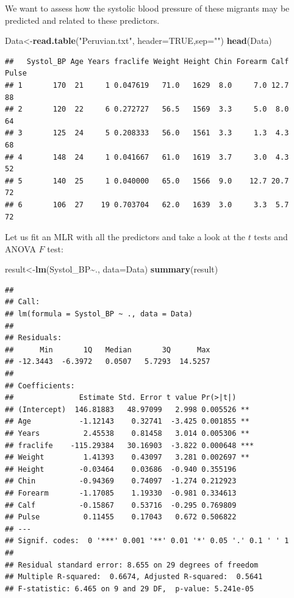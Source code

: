 \documentclass[
]{book}
\newenvironment{Shaded}{\begin{snugshade}}{\end{snugshade}}
\newcommand{\AttributeTok}[1]{\textcolor[rgb]{0.13,0.29,0.53}{#1}}
\newcommand{\ConstantTok}[1]{\textcolor[rgb]{0.56,0.35,0.01}{#1}}
\newcommand{\FunctionTok}[1]{\textcolor[rgb]{0.13,0.29,0.53}{\textbf{#1}}}
\newcommand{\NormalTok}[1]{#1}
\newcommand{\OtherTok}[1]{\textcolor[rgb]{0.56,0.35,0.01}{#1}}
\newcommand{\SpecialCharTok}[1]{\textcolor[rgb]{0.81,0.36,0.00}{\textbf{#1}}}
\newcommand{\StringTok}[1]{\textcolor[rgb]{0.31,0.60,0.02}{#1}}
\begin{document}
We want to assess how the systolic blood pressure of these migrants may be predicted and related to these predictors.

\begin{Shaded}
\begin{Highlighting}[]
\NormalTok{Data}\OtherTok{\textless{}{-}}\FunctionTok{read.table}\NormalTok{(}\StringTok{"Peruvian.txt"}\NormalTok{, }\AttributeTok{header=}\ConstantTok{TRUE}\NormalTok{,}\AttributeTok{sep=}\StringTok{""}\NormalTok{)}
\FunctionTok{head}\NormalTok{(Data)}
\end{Highlighting}
\end{Shaded}

\begin{verbatim}
##   Systol_BP Age Years fraclife Weight Height Chin Forearm Calf Pulse
## 1       170  21     1 0.047619   71.0   1629  8.0     7.0 12.7    88
## 2       120  22     6 0.272727   56.5   1569  3.3     5.0  8.0    64
## 3       125  24     5 0.208333   56.0   1561  3.3     1.3  4.3    68
## 4       148  24     1 0.041667   61.0   1619  3.7     3.0  4.3    52
## 5       140  25     1 0.040000   65.0   1566  9.0    12.7 20.7    72
## 6       106  27    19 0.703704   62.0   1639  3.0     3.3  5.7    72
\end{verbatim}

Let us fit an MLR with all the predictors and take a look at the \(t\) tests and ANOVA \(F\) test:

\begin{Shaded}
\begin{Highlighting}[]
\NormalTok{result}\OtherTok{\textless{}{-}}\FunctionTok{lm}\NormalTok{(Systol\_BP}\SpecialCharTok{\textasciitilde{}}\NormalTok{., }\AttributeTok{data=}\NormalTok{Data)}
\FunctionTok{summary}\NormalTok{(result)}
\end{Highlighting}
\end{Shaded}

\begin{verbatim}
## 
## Call:
## lm(formula = Systol_BP ~ ., data = Data)
## 
## Residuals:
##      Min       1Q   Median       3Q      Max 
## -12.3443  -6.3972   0.0507   5.7293  14.5257 
## 
## Coefficients:
##               Estimate Std. Error t value Pr(>|t|)    
## (Intercept)  146.81883   48.97099   2.998 0.005526 ** 
## Age           -1.12143    0.32741  -3.425 0.001855 ** 
## Years          2.45538    0.81458   3.014 0.005306 ** 
## fraclife    -115.29384   30.16903  -3.822 0.000648 ***
## Weight         1.41393    0.43097   3.281 0.002697 ** 
## Height        -0.03464    0.03686  -0.940 0.355196    
## Chin          -0.94369    0.74097  -1.274 0.212923    
## Forearm       -1.17085    1.19330  -0.981 0.334613    
## Calf          -0.15867    0.53716  -0.295 0.769809    
## Pulse          0.11455    0.17043   0.672 0.506822    
## ---
## Signif. codes:  0 '***' 0.001 '**' 0.01 '*' 0.05 '.' 0.1 ' ' 1
## 
## Residual standard error: 8.655 on 29 degrees of freedom
## Multiple R-squared:  0.6674, Adjusted R-squared:  0.5641 
## F-statistic: 6.465 on 9 and 29 DF,  p-value: 5.241e-05
\end{verbatim}
\end{document}
